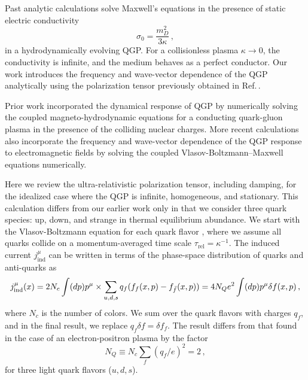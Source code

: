 Past analytic calculations \cite{Tuchin:2010vs,Deng:2012pc,McLerran:2013hla,Tuchin:2013apa,Gursoy:2014aka,Li:2016tel,Roy:2015kma} solve Maxwell's equations in the presence of static electric conductivity 
\begin{equation}
   \sigma_0 = \frac{m_D^2}{3\kappa}\,,
\end{equation} 
in a  hydrodynamically evolving QGP. For a collisionless plasma $\kappa\rightarrow0$, the conductivity is infinite, and the medium behaves as a perfect conductor. Our work introduces the frequency and wave-vector dependence of the QGP analytically using the polarization tensor previously obtained in Ref.\,\cite{Formanek:2021blc}.

Prior work \cite{Inghirami:2016iru,Inghirami:2019mkc} incorporated the dynamical response of QGP by numerically solving the coupled magneto-hydrodynamic equations for a conducting quark-gluon plasma in the presence of the colliding nuclear charges. More recent calculations \cite{Yan:2021zjc,Wang:2021oqq} also incorporate the frequency and wave-vector dependence of the QGP response to electromagnetic fields by solving the coupled Vlasov-Boltzmann--Maxwell equations  numerically.

Here we review the ultra-relativistic polarization tensor, including damping, for the idealized case where the QGP is infinite, homogeneous, and stationary. This calculation differs from our earlier work \cite{Formanek:2021blc} only in that we consider three quark species: up, down, and strange in thermal equilibrium abundance. We start with the Vlasov-Boltzmann equation for each quark flavor , where we assume all quarks collide on a momentum-averaged time scale $\tau_{\text{rel}} = \kappa^{-1}$. The induced current $ j_{\mathrm{ind}}^\mu$ can be written in terms of the phase-space distribution of quarks and anti-quarks as
\begin{equation}\label{eq:current}
   j_{\mathrm{ind}}^\mu(x) = 2 N_c \int (dp)p^\mu \\ \times \sum_{u,d,s} q_f (f_{f}(x,p) - f_{\bar{f}}(x,p))=  4 N_Q e^2 \int (dp)p^\mu \delta f(x,p)\,,
\end{equation}
where  $N_c$ is the number of colors. We sum over the quark flavors with charges $q_f$, and in the final result, we replace $q_f \delta f = \delta f_f$. The result  differs from that found in the case of an electron-positron plasma by the factor
\begin{equation}
N_Q \equiv N_c\sum_f (q_f/e)^2 = 2\,,
\end{equation}
for three light quark flavors ($u,d,s$).

